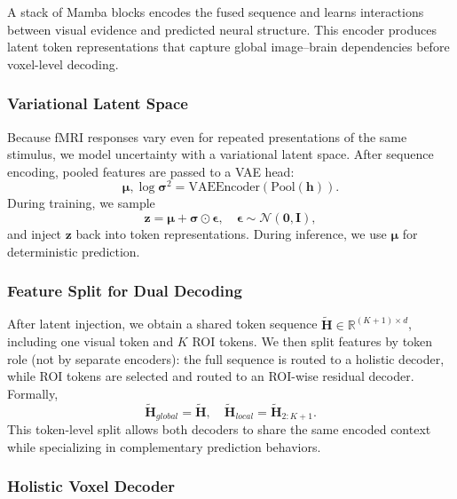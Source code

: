 A stack of Mamba blocks encodes the fused sequence and learns interactions between visual evidence and predicted neural structure. This encoder produces latent token representations that capture global image--brain dependencies before voxel-level decoding.

\subsubsection{Variational Latent Space}

Because fMRI responses vary even for repeated presentations of the same stimulus, we model uncertainty with a variational latent space. After sequence encoding, pooled features are passed to a VAE head:
\begin{equation}
  \boldsymbol{\mu}, \log\boldsymbol{\sigma}^2 = \text{VAEEncoder}(\text{Pool}(\mathbf{h})).
\end{equation}
During training, we sample
\begin{equation}
  \mathbf{z} = \boldsymbol{\mu} + \boldsymbol{\sigma} \odot \boldsymbol{\epsilon}, \quad \boldsymbol{\epsilon} \sim \mathcal{N}(\mathbf{0}, \mathbf{I}),
\end{equation}
and inject $\mathbf{z}$ back into token representations. During inference, we use $\boldsymbol{\mu}$ for deterministic prediction.

\subsubsection{Feature Split for Dual Decoding}

After latent injection, we obtain a shared token sequence $\tilde{\mathbf{H}} \in \mathbb{R}^{(K+1)\times d}$, including one visual token and $K$ ROI tokens. We then split features by token role (not by separate encoders): the full sequence is routed to a holistic decoder, while ROI tokens are selected and routed to an ROI-wise residual decoder. Formally,
\begin{equation}
  \tilde{\mathbf{H}}_{global} = \tilde{\mathbf{H}}, \quad \tilde{\mathbf{H}}_{local} = \tilde{\mathbf{H}}_{2:K+1}.
\end{equation}
This token-level split allows both decoders to share the same encoded context while specializing in complementary prediction behaviors.

\subsubsection{Holistic Voxel Decoder}

